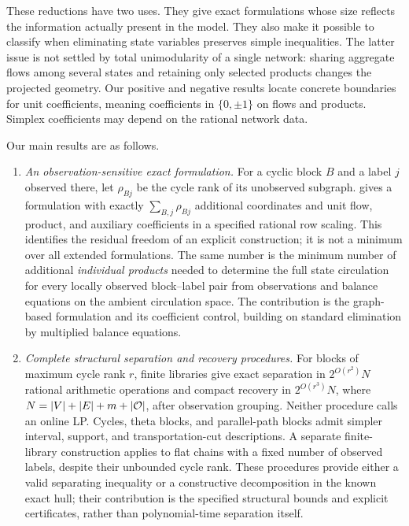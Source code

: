 These reductions have two uses. They give exact formulations whose size
reflects the information actually present in the model. They also make it
possible to classify when eliminating state variables preserves simple
inequalities. The latter issue is not settled by total unimodularity of a
single network: sharing aggregate flows among several states and retaining
only selected products changes the projected geometry. Our positive and
negative results locate concrete boundaries for unit coefficients, meaning
coefficients in $\{0,\pm1\}$ on flows and products. Simplex coefficients may
depend on the rational network data.

Our main results are as follows.
\begin{enumerate}[leftmargin=*,itemsep=5pt]
\item \emph{An observation-sensitive exact formulation.}
For a cyclic block $B$ and a label $j$ observed there, let $\rho_{Bj}$
be the cycle rank of its unobserved subgraph.
 gives a formulation with exactly
$\sum_{B,j}\rho_{Bj}$ additional coordinates and unit flow, product,
and auxiliary coefficients in a specified rational row scaling.
This identifies the residual freedom of an explicit construction; it is
not a minimum over all extended formulations. The same number is the
minimum number of additional \emph{individual products} needed to determine
the full state circulation for every locally observed block--label pair
from observations and balance equations on the ambient circulation space.
The contribution is
the graph-based formulation and its coefficient control, building on
standard elimination by multiplied balance equations.

\item \emph{Complete structural separation and recovery procedures.}
For blocks of maximum cycle rank $r$, finite libraries give exact
separation in $2^{O(r^2)}N$ rational arithmetic operations and compact
recovery in $2^{O(r^3)}N$, where
$N=|V|+|E|+m+|\mathcal O|$, after observation grouping. Neither procedure
calls an online LP. Cycles, theta blocks, and parallel-path blocks admit
simpler interval, support, and transportation-cut descriptions.
A separate finite-library construction applies to flat chains with a fixed
number of observed labels, despite their unbounded cycle rank.
These procedures provide either a valid separating inequality or a
constructive decomposition in the known exact hull; their contribution is
the specified structural bounds and explicit certificates, rather than
polynomial-time separation itself.


\end{enumerate}
